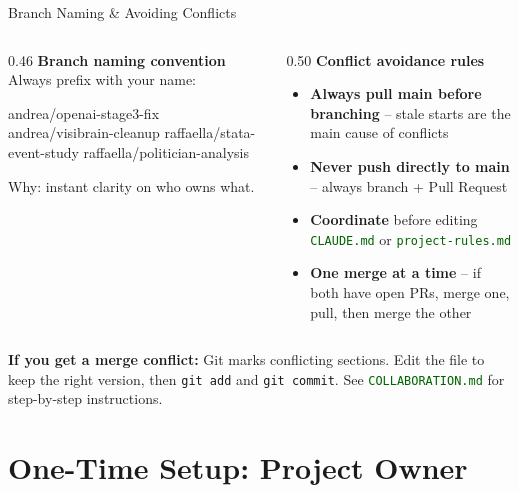 \documentclass[aspectratio=169,11pt,dvipsnames]{beamer}
\newcommand{\file}[1]{\textcolor{darkgreen}{\nolinkurl{#1}}}
\begin{document}
\begin{frame}[fragile]{Branch Naming \& Avoiding Conflicts}
  \begin{columns}[T]
    \begin{column}{0.46\textwidth}
    \scriptsize
      \textbf{Branch naming convention}\\[4pt]
      Always prefix with your name:
      \begin{codebox}
andrea/openai-stage3-fix
andrea/visibrain-cleanup
raffaella/stata-event-study
raffaella/politician-analysis
      \end{codebox}
      Why: instant clarity on who owns what.
    \end{column}
    \begin{column}{0.50\textwidth}
    \scriptsize
      \textbf{Conflict avoidance rules}
      \begin{itemize}\setlength\itemsep{4pt}
        \item \textbf{Always pull main before branching} -- stale starts are the main cause of conflicts
        \item \textbf{Never push directly to main} -- always branch + Pull Request
        \item \textbf{Coordinate} before editing \file{CLAUDE.md} or \file{project-rules.md}
        \item \textbf{One merge at a time} -- if both have open PRs, merge one, pull, then merge the other
      \end{itemize}
    \end{column}
  \end{columns}
  \vspace{0.3cm}
    \begin{greenbox}
    \scriptsize \textbf{If you get a merge conflict:} Git marks conflicting sections.
    Edit the file to keep the right version, then \texttt{git add} and \texttt{git commit}.
    See \file{COLLABORATION.md} for step-by-step instructions.
  \end{greenbox}
\end{frame}

\section{One-Time Setup: Project Owner}
\end{document}
